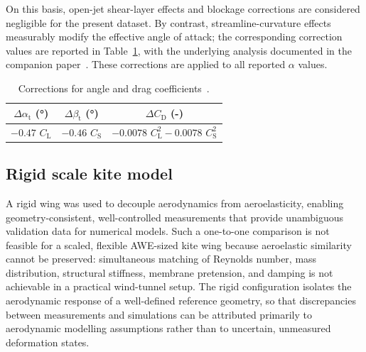 \documentclass[wes, manuscript]{copernicus}
\begin{document}
On this basis, open-jet shear-layer effects and blockage corrections are considered negligible for the present dataset. By contrast, streamline-curvature effects measurably modify the effective angle of attack; the corresponding correction values are reported in Table~\ref{tab:wind_tunnel_corrections}, with the underlying analysis documented in the companion paper~\citep{Poland2026a}. These corrections are applied to all reported $\alpha$ values.
%
\begin{table}[htp]
    \caption{Corrections for angle and drag coefficients~\citep{Poland2026a}.}
    \centering
    \begin{tabular}{ccc}
        \toprule
        $\Delta \alpha_\textrm{t}$ (\unit{\degree}) & $\Delta \beta_\textrm{t}$ (\unit{\degree}) & $\Delta C_\textrm{D}$ (\unit{-})\\ 
        \midrule
        $-0.47$ $C_{\textrm{L}}$ & $-0.46$ $C_{\textrm{S}}$ & $-0.0078$ $C_{\textrm{L}}^{2} - 0.0078$ $C_{\textrm{S}}^{2}$ \\
        \bottomrule
    \end{tabular}
    \label{tab:wind_tunnel_corrections}
\end{table}
%
\subsection{Rigid scale kite model}
%
A rigid wing was used to decouple aerodynamics from aeroelasticity, enabling geometry-consistent, well-controlled measurements that provide unambiguous validation data for numerical models. Such a one-to-one comparison is not feasible for a scaled, flexible AWE-sized kite wing because aeroelastic similarity cannot be preserved: simultaneous matching of Reynolds number, mass distribution, structural stiffness, membrane pretension, and damping is not achievable in a practical wind-tunnel setup. The rigid configuration isolates the aerodynamic response of a well-defined reference geometry, so that discrepancies between measurements and simulations can be attributed primarily to aerodynamic modelling assumptions rather than to uncertain, unmeasured deformation states.
\end{document}
